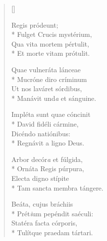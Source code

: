 \newHymn
{}

\begin{verse}[\versewidth]

 Regis pródeunt;\\*
Fulget Crucis mystérium,         \\
Qua vita mortem pértulit,\\*
Et morte vitam prótulit.
\pointtrans


Quae vulneráta lánceae                      \\*
Mucróne diro críminum         \\
Ut nos laváret sórdibus,                   \\*
Manávit und\emph{a} et sánguine.                   

Impléta sunt quae cóncinit                  \\*
David fidéli cármine,                       \\
Dicéndo natiónibus:                         \\*
Regnávit a ligno Deus.                      

Arbor decór\emph{a} et fúlgida,                    \\*
Ornáta Regis púrpura,                       \\
Electa digno stípite              \\*
Tam sancta membra tángere.                  

Beáta, cujus bráchiis                       \\*
Prét\emph{i}um pepéndit saéculi:                   \\
Statéra facta córporis,                     \\*
Tulítque praedam tártari.



\end{verse}
